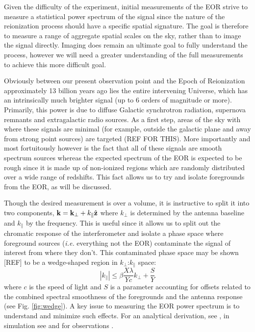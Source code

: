 \documentclass{article}
\newcommand{\kvec}{{\bf k}}
\newcommand{\kpr}{{k_\perp}}
\newcommand{\kvpr}{{\kvec_\perp}}
\newcommand{\kpar}{{k_\parallel}}
\begin{document}
Given the difficulty of the experiment, initial measurements of the EOR strive to measure a statistical power spectrum of the signal since the nature of the reionization process should have a specific spatial signature.  The goal is therefore to measure a range of aggregate spatial scales on the sky, rather than to image the signal directly.  Imaging does remain an ultimate goal to fully understand the process, however we will need a greater understanding of the full measurements to achieve this more difficult goal.  

Obviously between our present observation point and the Epoch of Reionization approximately 13 billion years ago lies the entire intervening Universe, which has an intrinsically much brighter signal (up to 6 orders of magnitude or more).  Primarily, this power is due to diffuse Galactic synchrotron radiation, supernova remnants and extragalactic radio sources.  As a first step, areas of the sky with where these signals are minimal (for example, outside the galactic plane and away from strong point sources) are targeted (REF FOR THIS).  More importantly and most fortuitously however is the fact that all of these signals are smooth spectrum sources whereas the expected spectrum of the EOR is expected to be rough since it is made up of non-ionized regions which are randomly distributed over a wide range of redshifts.  This fact allows us to try and isolate foregrounds from the EOR, as will be discussed.

Though the desired measurement is over a volume, it is instructive to split it into two components,  $\kvec =  \kvpr + \kpar{\hat {\bf z}}$ where $\kpr$ is determined by the antenna baseline and $\kpar$ by the frequency.  This is useful since it allows us to split out the chromatic response of the interferometer and isolate a phase space where foreground sources ({\em i.e.} everything not the EOR) contaminate the signal of interest from where they don't.  This contaminated phase space may be shown [REF] to be a wedge-shaped region in $\kpr$:$\kpar$ space:
\begin{equation}
|\kpar| \le \beta\frac{X\lambda}{Yc}\kpr + \frac{S}{Y}
\end{equation}
where $c$ is the speed of light and $S$ is a parameter accounting for offsets related to the combined spectral smoothness of the foregrounds and the antenna response (see Fig. \ref{fig:wedge}).  
A key issue to measuring the EOR power spectrum is to understand and minimize such effects.  For an analytical derivation, see \cite{2012ApJ...756..165P,vedantham_et_al2012,liu_et_al2014b},  in simulation see \cite{datta_et_al2010,hazelton_et_al2013} and for observations
\cite{2013ApJ...768L..36P,2015arXiv150601026P,2014ApJ...788..106P,2015arXiv150206016A}.
\end{document}
